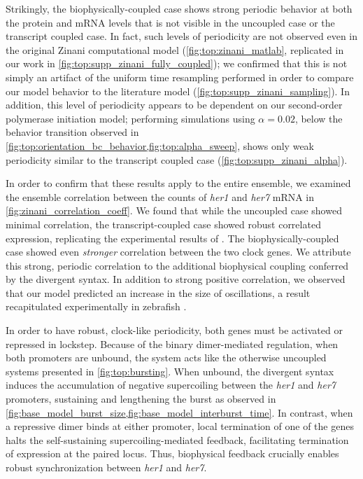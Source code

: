 \documentclass[11pt]{article}
\begin{document}
Strikingly, the biophysically-coupled case shows strong periodic behavior at both the protein and mRNA levels that is not visible in the uncoupled case or the transcript coupled case. In fact, such levels of periodicity are not observed even in the original Zinani computational model (\cref{fig:top:zinani_matlab}, replicated in our work in \cref{fig:top:supp_zinani_fully_coupled}); we confirmed that this is not simply an artifact of the uniform time resampling performed in order to compare our model behavior to the literature model (\cref{fig:top:supp_zinani_sampling}). In addition, this level of periodicity appears to be dependent on our second-order polymerase initiation model; performing simulations using \(\alpha = 0.02\), below the behavior transition observed in \cref{fig:top:orientation_bc_behavior,fig:top:alpha_sweep}, shows only weak periodicity similar to the transcript coupled case (\cref{fig:top:supp_zinani_alpha}).

In order to confirm that these results apply to the entire ensemble, we examined the ensemble correlation between the counts of \textit{her1} and \textit{her7} mRNA in \cref{fig:zinani_correlation_coeff}. We found that while the uncoupled case showed minimal correlation, the transcript-coupled case showed robust correlated expression, replicating the experimental results of \parencite{zinaniPairingSegmentationClock2021}. The biophysically-coupled case showed even \emph{stronger} correlation between the two clock genes. We attribute this strong, periodic correlation to the additional biophysical coupling conferred by the divergent syntax. In addition to strong positive correlation, we observed that our model predicted an increase in the size of oscillations, a result recapitulated experimentally in zebrafish \parencite{zinaniPairingSegmentationClock2021}.

In order to have robust, clock-like periodicity, both genes must be activated or repressed in lockstep. Because of the binary dimer-mediated regulation, when both promoters are unbound, the system acts like the otherwise uncoupled systems presented in \cref{fig:top:bursting}. When unbound, the divergent syntax induces the accumulation of negative supercoiling between the \textit{her1} and \textit{her7} promoters, sustaining and lengthening the burst as observed in \cref{fig:base_model_burst_size,fig:base_model_interburst_time}.
In contrast, when a repressive dimer binds at either promoter, local termination of one of the genes halts the self-sustaining supercoiling-mediated feedback, facilitating termination of expression at the paired locus. Thus, biophysical feedback crucially enables robust synchronization between \textit{her1} and \textit{her7}.
\end{document}

